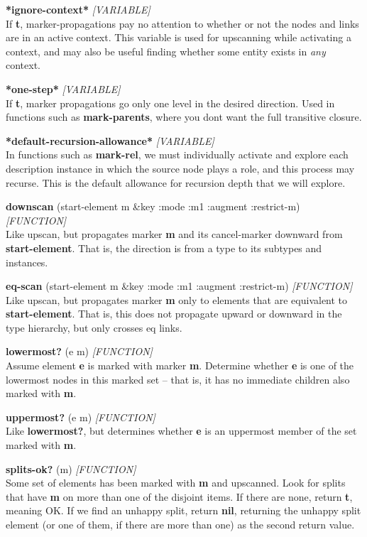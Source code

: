 \documentclass[titlepage,twoside,openright,11pt]{article}
\begin{document}
\textbf{*ignore-context*} \emph{{[}VARIABLE{]}}\\
If \textbf{t}, marker-propagations pay no attention to whether or not
the nodes and links are in an active context. This variable is used for
upscanning while activating a context, and may also be useful finding
whether some entity exists in \emph{any} context.

\textbf{*one-step*} \emph{{[}VARIABLE{]}}\\
If \textbf{t}, marker propagations go only one level in the desired
direction. Used in functions such as \textbf{mark-parents}, where you
don\textquotesingle t want the full transitive closure.

\textbf{*default-recursion-allowance*} \emph{{[}VARIABLE{]}}\\
In functions such as \textbf{mark-rel}, we must individually activate
and explore each description instance in which the source node plays a
role, and this process may recurse. This is the default allowance for
recursion depth that we will explore.

\textbf{downscan} (start-element m \&key :mode :m1 :augment :restrict-m)
\emph{{[}FUNCTION{]}}\\
Like upscan, but propagates marker \textbf{m} and its cancel-marker
downward from \textbf{start-element}. That is, the direction is from a
type to its subtypes and instances.

\textbf{eq-scan} (start-element m \&key :mode :m1 :augment :restrict-m)
\emph{{[}FUNCTION{]}}\\
Like upscan, but propagates marker \textbf{m} only to elements that are
equivalent to \textbf{start-element}. That is, this does not propagate
upward or downward in the type hierarchy, but only crosses eq links.

\textbf{lowermost?} (e m) \emph{{[}FUNCTION{]}}\\
Assume element \textbf{e} is marked with marker \textbf{m}. Determine
whether \textbf{e} is one of the lowermost nodes in this marked set --
that is, it has no immediate children also marked with \textbf{m}.

\textbf{uppermost?} (e m) \emph{{[}FUNCTION{]}}\\
Like \textbf{lowermost?}, but determines whether \textbf{e} is an
uppermost member of the set marked with \textbf{m}.

\textbf{splits-ok?} (m) \emph{{[}FUNCTION{]}}\\
Some set of elements has been marked with \textbf{m} and upscanned. Look
for splits that have \textbf{m} on more than one of the disjoint items.
If there are none, return \textbf{t}, meaning OK. If we find an unhappy
split, return \textbf{nil}, returning the unhappy split element (or one
of them, if there are more than one) as the second return value.
\end{document}
